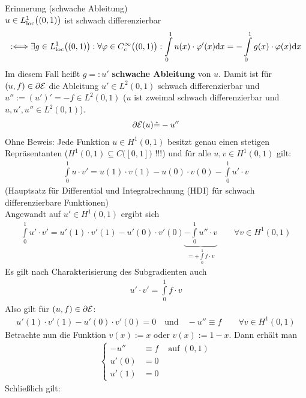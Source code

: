 \begin{beispiel}
	Erinnerung (schwache Ableitung)\\
	$u\in L^1_{\text{loc}}\big((0,1)\big)$ ist schwach differenzierbar
	\begin{align*}
		:\Longleftrightarrow\exists g\in L^1_{\text{loc}}\big((0,1)\big):\forall\varphi\in C_c^\infty\big((0,1)\big):
		\int\limits_0^1 u(x)\cdot\varphi'(x)\mathrm{d} x=-\int\limits_0^1 g(x)\cdot\varphi(x)\mathrm{d} x
	\end{align*}
	Im diesem Fall heißt $g=:u'$ \textbf{schwache Ableitung} von $u$. 
	Damit ist für $(u,f)\in\partial\mathcal{E}$ die Ableitung $u'\in L^2(0,1)$ schwach differenzierbar und $u'':=(u')'=-f\in L^2(0,1)$ 
	($u$ ist zweimal schwach differenzierbar und $u,u',u''\in L^2(0,1)$).
	\begin{align*}
		\partial\mathcal{E}(u)\hat{=}-u''
	\end{align*}
	Ohne Beweis: Jede Funktion $u\in H^1(0,1)$ besitzt genau einen stetigen Repräsentanten ($H^1(0,1)\subseteq C\big([0,1]\big)$ !!!) und für alle $u,v\in H^1(0,1)$ gilt:
	\begin{align*}
		\int\limits_0^1 u\cdot v'=u(1)\cdot v(1)-u(0)\cdot v(0)-\int\limits_0^1 u'\cdot v
	\end{align*} 
	(Hauptsatz für Differential und Integralrechnung (HDI) für schwach differenzierbare Funktionen)\\
	Angewandt auf $u'\in H^1(0,1)$ ergibt sich 
	\begin{align*}
		\int\limits_0^1 u'\cdot v'=u'(1)\cdot v'(1)-u'(0)\cdot v'(0)\underbrace{-\int\limits_0^1 u''\cdot v}_{=+\int\limits_0^1 f\cdot v}\qquad\forall v\in H^1(0,1)
	\end{align*}
	Es gilt nach Charakterisierung des Subgradienten auch 
	\begin{align*}
		u'\cdot v'=\int\limits_0^1 f\cdot v
	\end{align*}
	Also gilt für $(u,f)\in \partial\mathcal{E}$:
	\begin{align*}
		u'(1)\cdot v'(1)-u'(0)\cdot v'(0)=0\quad\text{und}\quad -u''\equiv f
		\qquad\forall v\in H^1(0,1)
	\end{align*}
	Betrachte nun die Funktion $v(x):=x$ oder $v(x):=1-x$. 
	Dann erhält man 
	\begin{align*}
		\left\lbrace\begin{array}{rll}
			-u'' &\equiv f &\text{ auf }(0,1)\\
			u'(0)&=0\\
			u'(1)&=0
		\end{array}\right.
	\end{align*}
	Schließlich gilt:
	\begin{align*}

\end{align*}
\end{beispiel}
